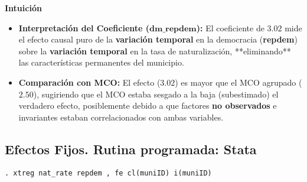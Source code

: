 \documentclass[12pt]{article}
\begin{document}
\vspace{0.3cm}

\noindent\textbf{Intuición}
\begin{itemize}
    \item \textbf{Interpretación del Coeficiente ($\mathbf{\text{dm\_repdem}}$):} El coeficiente de $\mathbf{3.02}$ mide el efecto causal puro de la \textbf{variación temporal} en la democracia (\textbf{repdem}) sobre la \textbf{variación temporal} en la tasa de naturalización, **eliminando** las características permanentes del municipio.
    \item \textbf{Comparación con MCO:} El efecto ($3.02$) es mayor que el MCO agrupado ($2.50$), sugiriendo que el MCO estaba sesgado a la baja (subestimado) el verdadero efecto, posiblemente debido a que factores \textbf{no observados} e invariantes estaban correlacionados con ambas variables.
\end{itemize}

\subsection*{\noindent\textbf{Efectos Fijos. Rutina programada: Stata}}

\begin{verbatim}
. xtreg nat_rate repdem , fe cl(muniID) i(muniID)
\end{verbatim}
\end{document}
